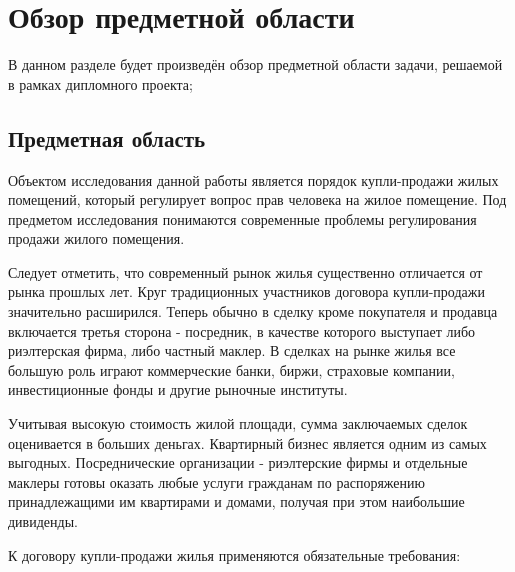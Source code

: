 
\section{Обзор предметной области} %
\label{sec:domain}

В данном разделе будет произведён обзор предметной области задачи, решаемой в рамках дипломного проекта;

\subsection{Предметная область}
\label{sub:domain:ip}
Объектом исследования данной работы является порядок купли-продажи жилых помещений, который регулирует вопрос прав человека на жилое помещение. Под предметом исследования понимаются современные проблемы регулирования продажи жилого помещения.

Следует отметить, что современный рынок жилья существенно отличается от рынка прошлых лет. Круг традиционных участников договора купли-продажи значительно расширился. Теперь обычно в сделку кроме покупателя и продавца включается третья сторона - посредник, в качестве которого выступает либо риэлтерская фирма, либо частный маклер. В сделках на рынке жилья все большую роль играют коммерческие банки, биржи, страховые компании, инвестиционные фонды и другие рыночные институты.

Учитывая высокую стоимость жилой площади, сумма заключаемых сделок оценивается в больших деньгах. Квартирный бизнес является одним из самых выгодных. Посреднические организации - риэлтерские фирмы и отдельные маклеры готовы оказать любые услуги гражданам по распоряжению принадлежащими им квартирами и домами, получая при этом наибольшие дивиденды.

К договору купли-продажи жилья применяются обязательные требования:

